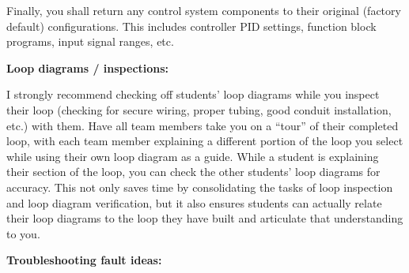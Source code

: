 \vskip 10pt

Finally, you shall return any control system components to their original (factory default) configurations.  This includes controller PID settings, function block programs, input signal ranges, etc.















\noindent
{\bf Loop diagrams / inspections:}

I strongly recommend checking off students' loop diagrams while you inspect their loop (checking for secure wiring, proper tubing, good conduit installation, etc.) with them.  Have all team members take you on a ``tour'' of their completed loop, with each team member explaining a different portion of the loop you select while using their own loop diagram as a guide.  While a student is explaining their section of the loop, you can check the other students' loop diagrams for accuracy.  This not only saves time by consolidating the tasks of loop inspection and loop diagram verification, but it also ensures students can actually relate their loop diagrams to the loop they have built and articulate that understanding to you.

\vskip 10pt

\goodbreak

\noindent
{\bf Troubleshooting fault ideas:}

